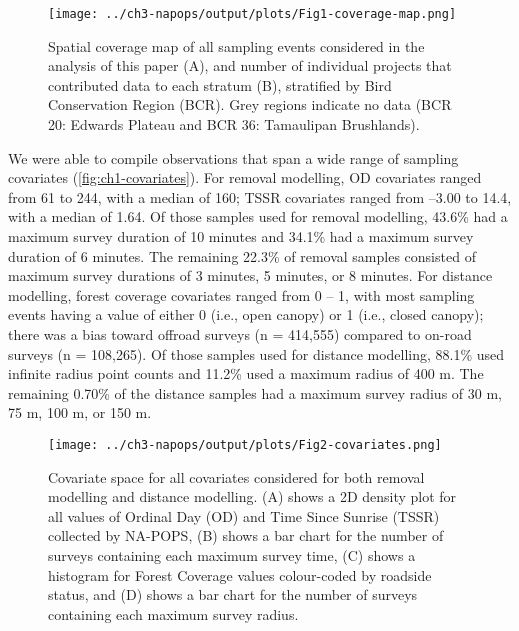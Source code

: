 \begin{figure}[h]
	\centering
	\texttt{[image: ../ch3-napops/output/plots/Fig1-coverage-map.png]}
	\caption{\label{fig:ch1-map}Spatial coverage map of all sampling events considered in the analysis of this paper (A), and number of individual projects that contributed data to each stratum (B), stratified by Bird Conservation Region (BCR). Grey regions indicate no data (BCR 20: Edwards Plateau and BCR 36: Tamaulipan Brushlands).}
\end{figure}

\par We were able to compile observations that span a wide range of sampling covariates (\autoref{fig:ch1-covariates}). For removal modelling, OD covariates ranged from 61 to 244, with a median of 160; TSSR covariates ranged from –3.00 to 14.4, with a median of 1.64. Of those samples used for removal modelling, 43.6\% had a maximum survey duration of 10 minutes and 34.1\% had a maximum survey duration of 6 minutes. The remaining 22.3\% of removal samples consisted of maximum survey durations of 3 minutes, 5 minutes, or 8 minutes. For distance modelling, forest coverage covariates ranged from 0 – 1, with most sampling events having a value of either 0 (i.e., open canopy) or 1 (i.e., closed canopy); there was a bias toward offroad surveys (n = 414,555) compared to on-road surveys (n = 108,265). Of those samples used for distance modelling, 88.1\% used infinite radius point counts and 11.2\% used a maximum radius of 400 m. The remaining 0.70\% of the distance samples had a maximum survey radius of 30 m, 75 m, 100 m, or 150 m.

\begin{figure}[h]
	\centering
	\texttt{[image: ../ch3-napops/output/plots/Fig2-covariates.png]}
	\caption{\label{fig:ch1-covariates}Covariate space for all covariates considered for both removal modelling and distance modelling. (A) shows a 2D density plot for all values of Ordinal Day (OD) and Time Since Sunrise (TSSR) collected by NA-POPS, (B) shows a bar chart for the number of surveys containing each maximum survey time, (C) shows a histogram for Forest Coverage values colour-coded by roadside status, and (D) shows a bar chart for the number of surveys containing each maximum survey radius.}
\end{figure}

